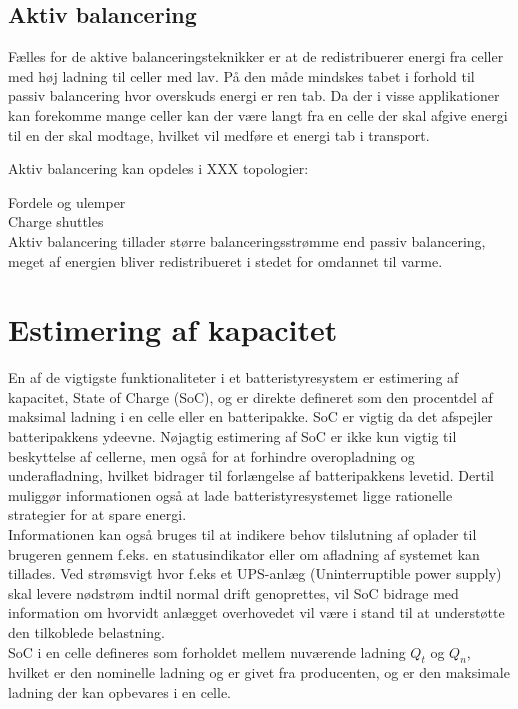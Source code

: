 \subsection{Aktiv balancering}
Fælles for de aktive balanceringsteknikker er at de redistribuerer energi fra celler med høj ladning til celler med lav. På den måde mindskes tabet i forhold til passiv balancering hvor overskuds energi er ren tab. Da der i visse applikationer kan forekomme mange celler kan der være langt fra en celle der skal afgive energi til en der skal modtage, hvilket vil medføre et energi tab i transport.

Aktiv balancering kan opdeles i XXX topologier:

Fordele og ulemper
\\

Charge shuttles
\\

Aktiv balancering tillader større balanceringsstrømme end passiv balancering, meget af energien bliver redistribueret i stedet for omdannet til varme. 





\section{Estimering af kapacitet}
En af de vigtigste funktionaliteter i et batteristyresystem er estimering af kapacitet, State of Charge (SoC), og er direkte defineret som den procentdel af maksimal ladning i en celle eller en batteripakke. SoC er vigtig da det afspejler batteripakkens ydeevne. Nøjagtig estimering af SoC er ikke kun vigtig til beskyttelse af cellerne, men også for at forhindre overopladning og underafladning, hvilket bidrager til forlængelse af batteripakkens levetid. Dertil muliggør informationen også at lade batteristyresystemet ligge rationelle strategier for at spare energi.
\\
Informationen kan også bruges til at indikere behov tilslutning af oplader til brugeren gennem f.eks. en statusindikator eller om afladning af systemet kan tillades. 
Ved strømsvigt hvor f.eks et UPS-anlæg (Uninterruptible power supply) skal levere nødstrøm indtil normal drift genoprettes, vil SoC bidrage med information om hvorvidt anlægget overhovedet vil være i stand til at understøtte den tilkoblede belastning.
\\

SoC i en celle defineres som forholdet mellem nuværende ladning $Q_{t}$ og $Q_{n}$, hvilket er den nominelle ladning og er givet fra producenten, og er den maksimale ladning der kan opbevares i en celle.

